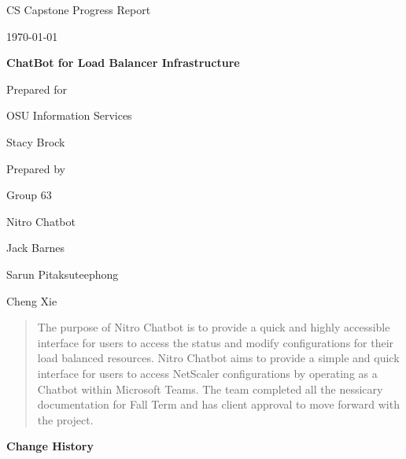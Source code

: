 \documentclass[onecolumn, draftclsnofoot,10pt, compsoc]{IEEEtran}
\def \CapstoneTeamName{		    Nitro Chatbot}
\def \CapstoneTeamNumber{		63}
\def \GroupMemberOne{			Jack Barnes}
\def \GroupMemberTwo{			Sarun Pitaksuteephong}
\def \GroupMemberThree{			Cheng Xie}
\def \CapstoneProjectName{		ChatBot for Load Balancer Infrastructure}
\def \CapstoneSponsorCompany{	OSU Information Services}
\def \CapstoneSponsorPerson{	Stacy Brock}
\def \DocType{	%
				Progress Report
				}
\newcommand{\NameSigPair}[1]{\par
\makebox[2.75in][r]{#1} \hfil 	\makebox[3.25in]{\makebox[2.25in]{\hrulefill} \hfill		\makebox[.75in]{\hrulefill}}
\par\vspace{-12pt} \textit{\tiny\noindent
\makebox[2.75in]{} \hfil		\makebox[3.25in]{\makebox[2.25in][r]{Signature} \hfill	\makebox[.75in][r]{Date}}}}
\renewcommand{\NameSigPair}[1]{#1}
\begin{document}
\begin{titlepage}
    \begin{singlespace}
        \hfill 
        \par\vspace{.2in}
        \centering
        \scshape{
            \huge CS Capstone \DocType \par
            {\large\today}\par
            \vspace{.5in}
            \textbf{\Huge\CapstoneProjectName}\par
            \vfill
            \vfill
            {\large Prepared for}\par
            \Huge \CapstoneSponsorCompany\par
            \vspace{5pt}
            {\Large\NameSigPair{\CapstoneSponsorPerson}\par}
            {\large Prepared by }\par
            Group\CapstoneTeamNumber\par
            \CapstoneTeamName\par 
            \vspace{5pt}
            {\Large
                \NameSigPair{\GroupMemberOne}\par
                \NameSigPair{\GroupMemberTwo}\par
                \NameSigPair{\GroupMemberThree}\par
            }
            \vspace{20pt}
        }
        \begin{abstract}
        The purpose of Nitro Chatbot is to provide a quick and highly accessible interface for users to access the status and modify configurations for their load balanced resources. Nitro Chatbot aims to provide a simple and quick interface for users to access NetScaler configurations by operating as a Chatbot within Microsoft Teams. The team completed all the nessicary documentation for Fall Term and has client approval to move forward with the project.
        \end{abstract}     
    \end{singlespace}
\end{titlepage}
\newpage
{}
\clearpage
\textbf{Change History}\par
\end{document}
